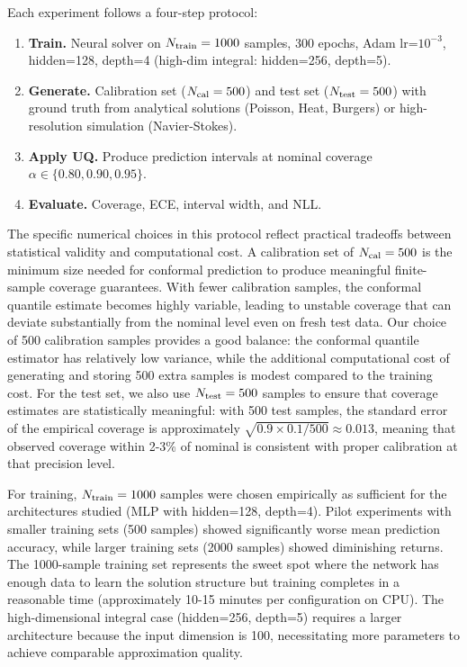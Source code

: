 \documentclass[12pt,a4paper]{article}
\theoremstyle{plain}
\begin{document}
Each experiment follows a four-step protocol:
\begin{enumerate}
    \item \textbf{Train.} Neural solver on $N_{\rm train}=1000$ samples,
        300 epochs, Adam lr=$10^{-3}$, hidden=128, depth=4
        (high-dim integral: hidden=256, depth=5).
    \item \textbf{Generate.} Calibration set ($N_{\rm cal}=500$) and test set
        ($N_{\rm test}=500$) with ground truth from analytical solutions
        (Poisson, Heat, Burgers) or high-resolution simulation (Navier-Stokes).
    \item \textbf{Apply UQ.} Produce prediction intervals at nominal coverage
        $\alpha \in \{0.80, 0.90, 0.95\}$.
    \item \textbf{Evaluate.} Coverage, ECE, interval width, and NLL.
\end{enumerate}

The specific numerical choices in this protocol reflect practical
tradeoffs between statistical validity and computational cost.
A calibration set of $N_{\rm cal}=500$ is the minimum size needed
for conformal prediction to produce meaningful finite-sample coverage
guarantees. With fewer calibration samples, the conformal quantile
estimate becomes highly variable, leading to unstable coverage that
can deviate substantially from the nominal level even on fresh test data.
Our choice of 500 calibration samples provides a good balance: the
conformal quantile estimator has relatively low variance, while the
additional computational cost of generating and storing 500 extra samples
is modest compared to the training cost. For the test set, we also use
$N_{\rm test}=500$ samples to ensure that coverage estimates are
statistically meaningful: with 500 test samples, the standard error
of the empirical coverage is approximately $\sqrt{0.9 \times 0.1 / 500} \approx 0.013$,
meaning that observed coverage within 2-3\% of nominal is consistent with
proper calibration at that precision level.

For training, $N_{\rm train}=1000$ samples were chosen empirically as
sufficient for the architectures studied (MLP with hidden=128, depth=4).
Pilot experiments with smaller training sets (500 samples) showed
significantly worse mean prediction accuracy, while larger training sets
(2000 samples) showed diminishing returns. The 1000-sample training set
represents the sweet spot where the network has enough data to learn the
solution structure but training completes in a reasonable time (approximately
10-15 minutes per configuration on CPU). The high-dimensional integral
case (hidden=256, depth=5) requires a larger architecture because the
input dimension is 100, necessitating more parameters to achieve
comparable approximation quality.
\end{document}
